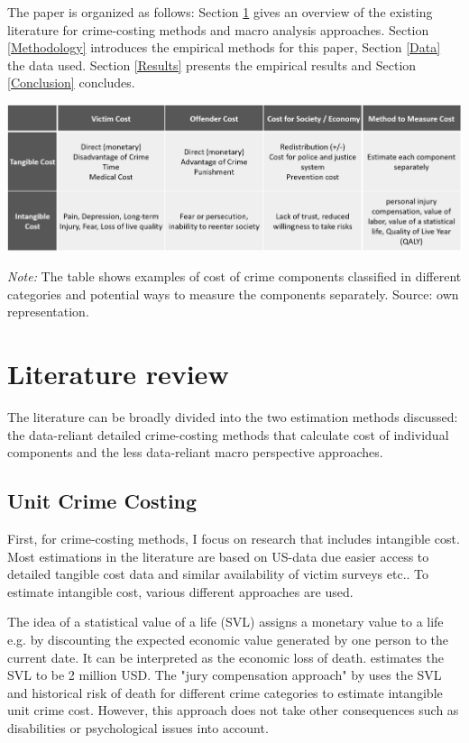 \documentclass[a4paper,12pt]{article}
\begin{document}
The paper is organized as follows: Section \ref{Literature Review} gives an overview of the existing literature for crime-costing methods and macro analysis approaches. Section \ref{Methodology} introduces the empirical methods for this paper, Section \ref{Data} the data used. Section \ref{Results} presents the empirical results and Section \ref{Conclusion} concludes. 
\begin{table}
\begin{minipage}{0.9\textwidth}
  \includegraphics[trim={0 0 0 0},width=\linewidth]{charts/table_unit_cost.png}
\begin{flushleft}
\footnotesize{\textit{Note:} The table shows examples of cost of crime components classified in different categories and potential ways to measure the components separately. Source: own representation.
\label{tab:unit_cost_crime}	
}
\end{flushleft}
\end{minipage}
\end{table}


\section{Literature review}
\label{Literature Review}
The literature can be broadly divided into the two estimation methods discussed: the data-reliant detailed crime-costing methods that calculate cost of individual components and the less data-reliant macro perspective approaches. 


\subsection{Unit Crime Costing}
First, for crime-costing methods, I focus on research that includes intangible cost. Most estimations in the literature are based on US-data due easier access to detailed tangible cost data and similar availability of victim surveys etc..
To estimate intangible cost, various different approaches are used. 

The idea of a statistical value of a life (SVL) assigns a monetary value to a life e.g. by discounting the expected economic value generated by one person to the current date. It can be interpreted as the economic loss of death. \cite{viscusi} estimates the SVL to be 2 million USD.
The "jury compensation approach" by \citep{cohen1988} uses the SVL and historical risk of death for different crime categories to estimate intangible unit crime cost. However, this approach does not take other consequences such as disabilities or psychological issues into account.
\end{document}
